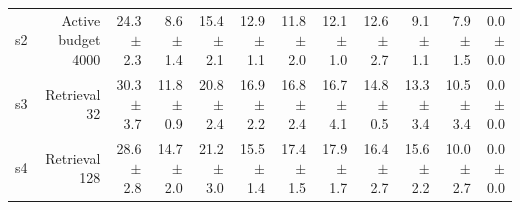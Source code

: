 \documentclass{article}
\begin{document}
\begin{table}[htbp]
\begin{tabular}{lrrrrrrrrrrr}
    s2 & Active budget 4000 & 24.3 $\pm$ 2.3 & 8.6 $\pm$ 1.4 & 15.4 $\pm$ 2.1 & 12.9 $\pm$ 1.1 & 11.8 $\pm$ 2.0 & 12.1 $\pm$ 1.0 & 12.6 $\pm$ 2.7 & 9.1 $\pm$ 1.1 & 7.9 $\pm$ 1.5 & 0.0 $\pm$ 0.0 \\
    s3 & Retrieval 32 & 30.3 $\pm$ 3.7 & 11.8 $\pm$ 0.9 & 20.8 $\pm$ 2.4 & 16.9 $\pm$ 2.2 & 16.8 $\pm$ 2.4 & 16.7 $\pm$ 4.1 & 14.8 $\pm$ 0.5 & 13.3 $\pm$ 3.4 & 10.5 $\pm$ 3.4 & 0.0 $\pm$ 0.0 \\
    s4 & Retrieval 128 & 28.6 $\pm$ 2.8 & 14.7 $\pm$ 2.0 & 21.2 $\pm$ 3.0 & 15.5 $\pm$ 1.4 & 17.4 $\pm$ 1.5 & 17.9 $\pm$ 1.7 & 16.4 $\pm$ 2.7 & 15.6 $\pm$ 2.2 & 10.0 $\pm$ 2.7 & 0.0 $\pm$ 0.0 \\
    \bottomrule
  \end{tabular}
\end{table}
\end{document}
